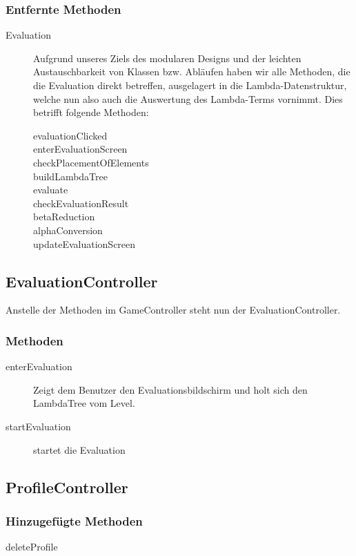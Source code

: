 \documentclass[parskip=full]{scrreprt}
\begin{document}
\subsubsection{Entfernte Methoden}
\begin{description}
	\item[Evaluation] Aufgrund unseres Ziels des modularen Designs und der leichten Austauschbarkeit von Klassen bzw. Abläufen haben wir alle Methoden, die die Evaluation direkt betreffen, ausgelagert in die Lambda-Datenstruktur, welche nun also auch die Auswertung des Lambda-Terms vornimmt. Dies betrifft folgende Methoden:
		\begin{description}
			\item[evaluationClicked]
			\item[enterEvaluationScreen]
			\item[checkPlacementOfElements]
			\item[buildLambdaTree]
			\item[evaluate]
			\item[checkEvaluationResult]
			\item[betaReduction]
			\item[alphaConversion]
			\item[updateEvaluationScreen]
		\end{description}
	
\end{description}

\subsection{EvaluationController}
Anstelle der Methoden im GameController steht nun der EvaluationController.
	\subsubsection{Methoden}
	\begin{description} 
		\item[enterEvaluation] Zeigt dem Benutzer den Evaluationsbildschirm und holt sich den LambdaTree vom Level.
		\item[startEvaluation] startet die Evaluation
	\end{description}


\subsection{ProfileController}

\subsubsection{Hinzugefügte Methoden}
\begin{description}
	\item[deleteProfile]
\end{description}
\end{document}
